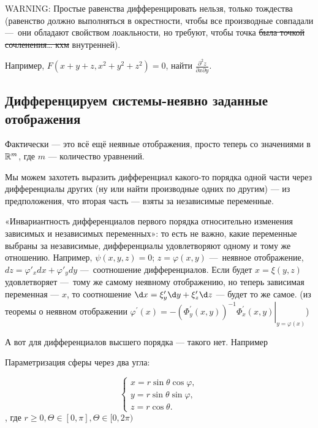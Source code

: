 \documentclass[12pt, a4paper]{article}
\begin{document}
WARNING: Простые равенства дифференцировать нельзя, только тождества 
(равенство должно выполняться в окрестности, чтобы все производные совпадали — они обладают свойством лоакльности, но требуют, чтобы точка 
\sout{была точкой сочленения… кхм} внутренней).

Например, $F(x + y + z, x^2 + y^2 + z^2) = 0$, найти $\frac{\partial^2 z}{\partial x \partial y}$.

\subsection{Дифференцируем системы-неявно заданные отображения}

Фактически — это всё ещё неявные отображения, просто теперь со значениями в ${\mathbb{R}}^{m}$, где $m$ — количество уравнений.

Мы можем захотеть выразить дифференциал какого-то порядка одной части через дифференциалы других 
(ну или найти производные одних по другим) — из предположения, что вторая часть — взяты за независимые переменные.

«Инвариантность дифференциалов первого порядка относительно изменения зависимых и независимых переменных»:
то есть не важно, какие переменные выбраны за независимые, дифференциалы удовлетворяют одному и тому же отношению.
Например, $\psi(x, y, z) = 0$; $z = \varphi(x, y)$ — неявное отображение, $dz = \varphi'_x dx + \varphi'_y dy$ — соотношение дифференциалов. 
Если будет $x = \xi(y, z)$ удовлетворяет — тому же самому неявному отображению, 
но теперь зависимая переменная — $x$, то соотношение $\d x = \xi'_y \d y + \xi'_z \d z$ — будет то же самое.
(из теоремы о неявном отображении $\varphi^{\prime}(x)=-\left.\left(\Phi_y^{\prime}(x, y)\right)^{-1} \Phi_x^{\prime}(x, y)\right|_{y=\varphi(x)}$)


А вот для дифференциалов высшего порядка — такого нет.
Например


Параметризация сферы через два угла:

\begin{equation}
  {\displaystyle {\begin{cases}x=r\sin \theta \cos \varphi ,\\y=r\sin \theta \sin \varphi ,\\z=r\cos \theta .\end{cases}}}
\end{equation}
, где $r \geq 0, \Theta \in [0, \pi], \Theta \in [0, 2\pi)$
\end{document}
